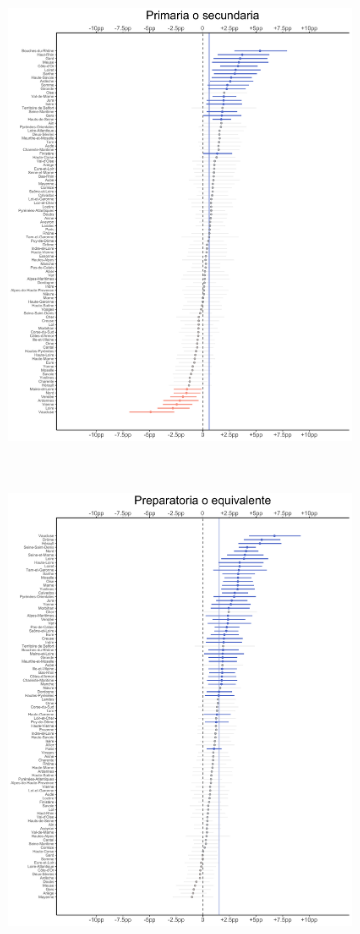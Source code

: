 \begin{figure}
\begin{subfigure}{0.45\textwidth}
	\includegraphics[width = \textwidth]{Figs/Efectos/Efectos_Dip2_Modelo_H}
	\end{subfigure}
	~
	\begin{subfigure}{0.45\textwidth}
	\includegraphics[width = \textwidth]{Figs/Efectos/Efectos_Dip3_Modelo_H}

\end{subfigure}
\end{figure}
